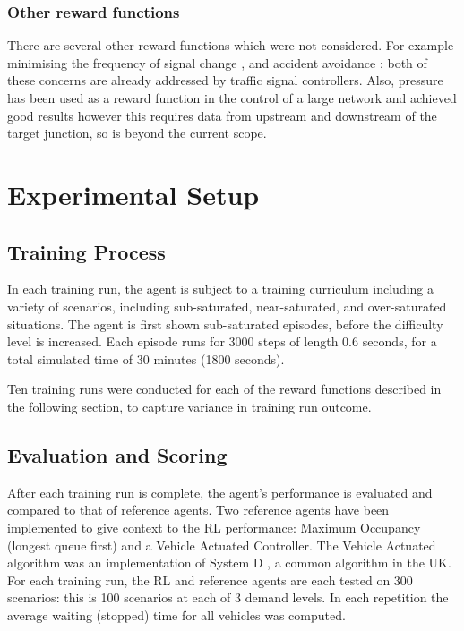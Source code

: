 \documentclass[conference]{IEEEtran}
\begin{document}
\subsubsection{Other reward functions}
There are several other reward functions which were not considered. For example minimising the frequency of signal change \cite{vanderpol2016} \cite{wei2018}, and accident avoidance \cite{vanderpol2016}: both of these concerns are already addressed by traffic signal controllers. Also, pressure has been used as a reward function in the control of a large network \cite{yau} \cite{wei2019} \cite{varaiya2013} \cite{wei2018} \cite{wei2019a} \cite{chen2020} and achieved good results however this requires data from upstream and downstream of the target junction, so is beyond the current scope.

\section{Experimental Setup}\label{exp_setup}
\subsection{Training Process}

In each training run, the agent is subject to a training curriculum including a variety of scenarios, including sub-saturated, near-saturated, and over-saturated situations. The agent is first shown sub-saturated episodes, before the difficulty level is increased. Each episode runs for 3000 steps of length 0.6 seconds, for a total simulated time of 30 minutes (1800 seconds).

Ten training runs were conducted for each of the reward functions described in the following section, to capture variance in training run outcome.

\subsection{Evaluation and Scoring}
After each training run is complete, the agent's performance is evaluated and compared to that of reference agents. Two reference agents have been implemented to give context to the RL performance: Maximum Occupancy (longest queue first) and a Vehicle Actuated Controller. The Vehicle Actuated algorithm was an implementation of System D \cite{highways}, a common algorithm in the UK.  For each training run, the RL and reference agents are each tested on 300 scenarios: this is 100 scenarios at each of 3 demand levels. In each repetition the average waiting (stopped) time for all vehicles was computed.
\end{document}
